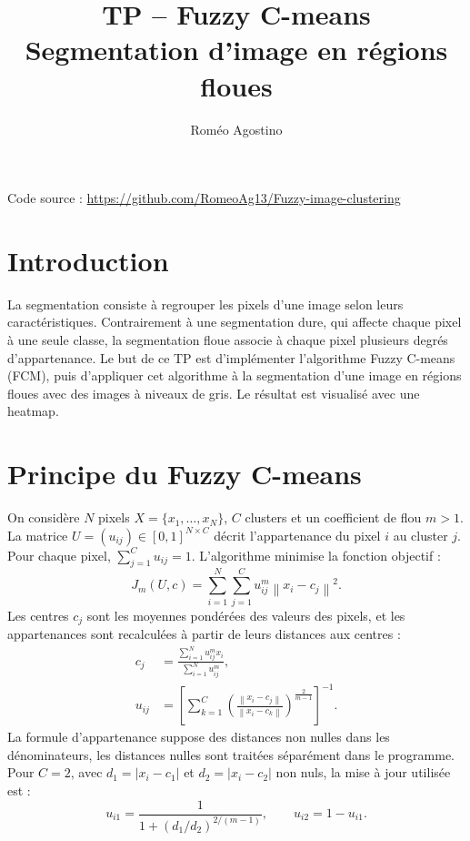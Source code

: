 ﻿\documentclass[10pt,a4paper]{article}
\title{\vspace{-1.3cm}\textbf{TP -- Fuzzy C-means}\\[0.25em]\large Segmentation d'image en régions floues}
\author{Roméo Agostino}
\date{}
\newcommand{\norm}[1]{\left\lVert #1\right\rVert}
\begin{document}
\maketitle
\vspace{-1.0cm}
\begin{center}
Code source : \url{https://github.com/RomeoAg13/Fuzzy-image-clustering}
\end{center}

\section{Introduction}
La segmentation consiste à regrouper les pixels d'une image selon leurs caractéristiques. Contrairement à une segmentation dure, qui affecte chaque pixel à une seule classe, la segmentation floue associe à chaque pixel plusieurs degrés d'appartenance. Le but de ce TP est d'implémenter l'algorithme Fuzzy C-means (FCM), puis d'appliquer cet algorithme à la segmentation d'une image en régions floues avec des images à niveaux de gris. Le résultat est visualisé avec une heatmap.

\section{Principe du Fuzzy C-means}
On considère $N$ pixels $X=\{x_1,\ldots,x_N\}$, $C$ clusters et un coefficient de flou $m>1$. \\ La matrice $U=(u_{ij})\in[0,1]^{N\times C}$ décrit l'appartenance du pixel $i$ au cluster $j$. \\ Pour chaque pixel, $\sum_{j=1}^{C}u_{ij}=1$. L'algorithme minimise la fonction objectif :
\begin{equation*}
J_m(U,c)=\sum_{i=1}^{N}\sum_{j=1}^{C}u_{ij}^{m}\norm{x_i-c_j}^{2}.
\end{equation*}
Les centres $c_j$ sont les moyennes pondérées des valeurs des pixels, et les appartenances sont recalculées à partir de leurs distances aux centres :
\begin{align*}
c_j&=\frac{\sum_{i=1}^{N}u_{ij}^{m}x_i}{\sum_{i=1}^{N}u_{ij}^{m}}, \\[2pt]
u_{ij}&=\left[\sum_{k=1}^{C}\left(\frac{\norm{x_i-c_j}}{\norm{x_i-c_k}}\right)^{\frac{2}{m-1}}\right]^{-1}.
\end{align*}
La formule d'appartenance suppose des distances non nulles dans les dénominateurs, les distances nulles sont traitées séparément dans le programme. Pour $C=2$, avec $d_1=|x_i-c_1|$ et $d_2=|x_i-c_2|$ non nuls, la mise à jour utilisée est :
\begin{equation*}
u_{i1}=\frac{1}{1+(d_1/d_2)^{2/(m-1)}},\qquad u_{i2}=1-u_{i1}.
\end{equation*}
\end{document}
